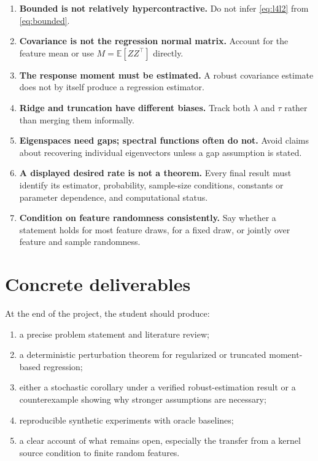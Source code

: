 \documentclass[11pt]{article}
\newcommand{\E}{\mathbb{E}}
\begin{document}
\begin{enumerate}
 \item \textbf{Bounded is not relatively hypercontractive.}  Do not infer
       \eqref{eq:l4l2} from \eqref{eq:bounded}.
 \item \textbf{Covariance is not the regression normal matrix.}  Account for
       the feature mean or use $M=\E[ZZ^\top]$ directly.
 \item \textbf{The response moment must be estimated.}  A robust covariance
       estimate does not by itself produce a regression estimator.
 \item \textbf{Ridge and truncation have different biases.}  Track both
       $\lambda$ and $\tau$ rather than merging them informally.
 \item \textbf{Eigenspaces need gaps; spectral functions often do not.}  Avoid
       claims about recovering individual eigenvectors unless a gap assumption
       is stated.
 \item \textbf{A displayed desired rate is not a theorem.}  Every final result
       must identify its estimator, probability, sample-size conditions,
       constants or parameter dependence, and computational status.
 \item \textbf{Condition on feature randomness consistently.}  Say whether a
       statement holds for most feature draws, for a fixed draw, or jointly
       over feature and sample randomness.
\end{enumerate}

\section{Concrete deliverables}

At the end of the project, the student should produce:
\begin{enumerate}
 \item a precise problem statement and literature review;
 \item a deterministic perturbation theorem for regularized or truncated
       moment-based regression;
 \item either a stochastic corollary under a verified robust-estimation result
       or a counterexample showing why stronger assumptions are necessary;
 \item reproducible synthetic experiments with oracle baselines;
 \item a clear account of what remains open, especially the transfer from a
       kernel source condition to finite random features.
\end{enumerate}
\end{document}
